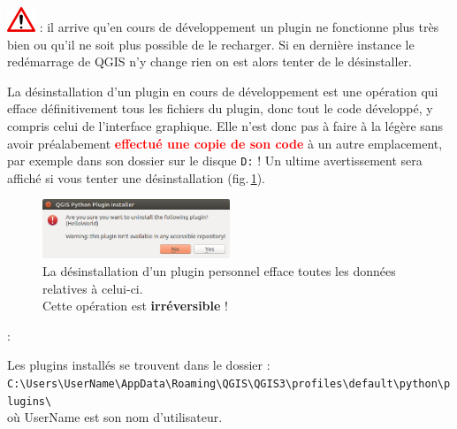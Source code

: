 \documentclass[11pt]{article}
\begin{document}
\newpage{}
\vspace*{-2em}
\includegraphics[scale=1]{warningt.png} \underline{\smash{\textbf{\textcolor{red}{Attention}}}}: il arrive qu'en cours de développement un plugin ne fonctionne plus très bien ou qu'il ne soit plus possible de le recharger. Si en dernière instance le redémarrage de QGIS n'y change rien on est alors tenter de le désinstaller. 

La désinstallation d'un plugin en cours de développement est une opération qui efface définitivement tous les fichiers du plugin, donc tout le code développé, y compris celui de l'interface graphique. Elle n'est donc pas à faire à la légère sans avoir préalabement \textbf{\textcolor{red}{effectué une copie de son code}} à un autre emplacement, par exemple dans son dossier sur le disque \texttt{D:} ! Un ultime avertissement sera affiché si vous tenter une désinstallation (fig.\,\ref{uninstall}).\\

\vspace*{-2em}
\begin{figure}[H]
\centering
\includegraphics[width=0.5\textwidth]{uninstall_warning.png}
\vspace*{-0.64em}
\caption[La désinstallation d'un plugin personnel efface toutes les données relatives à celui-ci.]{La désinstallation d'un plugin personnel efface toutes les données relatives à celui-ci.\\
Cette opération est \textbf{irréversible} !}
\label{uninstall}
\end{figure}
\vspace*{-1em}


\underline{}: 

Les plugins installés se trouvent dans le dossier : \\
\texttt{C:\textbackslash{}Users\textbackslash{}\textcolor{mygreen}{UserName}\textbackslash{}AppData\textbackslash{}Roaming\textbackslash{}QGIS\textbackslash{}QGIS3\textbackslash{}profiles\textbackslash{}default\textbackslash{}python\textbackslash{}plugins\textbackslash{}}\\
où \textcolor{mygreen}{UserName} est son nom d'utilisateur. 
\end{document}
